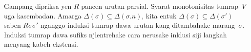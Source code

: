 \documentclass[../../../include/open-logic-section]{subfiles}
\begin{document}
Gampang dipriksa yen $R$ pancen urutan parsial. Syarat monotonisitas
tumrap~$V$ uga kasembadan. Amarga
$\Delta(\sigma) \subseteq \Delta(\sigma.n)$, kita entuk
$\Delta(\sigma) \subseteq \Delta(\sigma')$ saben $R\sigma\sigma'$
nganggo induksi tumrap dawa urutan kang ditambahake marang~$\sigma$.
Induksi tumrap dawa sufiks njlentrehake cara nerusake inklusi siji langkah menyang kabeh ekstensi.
\end{document}

